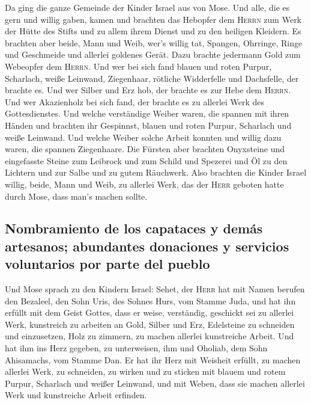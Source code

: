  Da ging die ganze Gemeinde der Kinder Israel aus von
Mose.  Und alle, die es gern und willig gaben, kamen und
brachten das Hebopfer dem \textsc{Herrn} zum Werk der Hütte des Stifts
und zu allem ihrem Dienst und zu den heiligen Kleidern. 
Es brachten aber beide, Mann und Weib, wer's willig tat, Spangen,
Ohrringe, Ringe und Geschmeide und allerlei goldenes Gerät. Dazu brachte
jedermann Gold zum Webeopfer dem \textsc{Herrn}.  Und wer
bei sich fand blauen und roten Purpur, Scharlach, weiße Leinwand,
Ziegenhaar, rötliche Widderfelle und Dachsfelle, der brachte es.
 Und wer Silber und Erz hob, der brachte es zur Hebe dem
\textsc{Herrn}. Und wer Akazienholz bei sich fand, der brachte es zu
allerlei Werk des Gottesdienstes.  Und welche verständige
Weiber waren, die spannen mit ihren Händen und brachten ihr Gespinnst,
blauen und roten Purpur, Scharlach und weiße Leinwand. 
Und welche Weiber solche Arbeit konnten und willig dazu waren, die
spannen Ziegenhaare.  Die Fürsten aber brachten
Onyxsteine und eingefasste Steine zum Leibrock und zum Schild
 und Spezerei und Öl zu den Lichtern und zur Salbe und zu
gutem Räuchwerk.  Also brachten die Kinder Israel willig,
beide, Mann und Weib, zu allerlei Werk, das der \textsc{Herr} geboten
hatte durch Mose, dass man's machen sollte.

\hypertarget{nombramiento-de-los-capataces-y-demuxe1s-artesanos-abundantes-donaciones-y-servicios-voluntarios-por-parte-del-pueblo}{%
\subsection{Nombramiento de los capataces y demás artesanos; abundantes
donaciones y servicios voluntarios por parte del
pueblo}\label{nombramiento-de-los-capataces-y-demuxe1s-artesanos-abundantes-donaciones-y-servicios-voluntarios-por-parte-del-pueblo}}

 Und Mose sprach zu den Kindern Israel: Sehet, der
\textsc{Herr} hat mit Namen berufen den Bezaleel, den Sohn Uris, des
Sohnes Hurs, vom Stamme Juda,  und hat ihn erfüllt mit
dem Geist Gottes, dass er weise, verständig, geschickt sei zu allerlei
Werk,  kunstreich zu arbeiten an Gold, Silber und Erz,
 Edelsteine zu schneiden und einzusetzen, Holz zu
zimmern, zu machen allerlei kunstreiche Arbeit.  Und hat
ihm ins Herz gegeben, zu unterweisen, ihm und Oholiab, dem Sohn
Ahisamachs, vom Stamme Dan.  Er hat ihr Herz mit Weisheit
erfüllt, zu machen allerlei Werk, zu schneiden, zu wirken und zu sticken
mit blauem und rotem Purpur, Scharlach und weißer Leinwand, und mit
Weben, dass sie machen allerlei Werk und kunstreiche Arbeit erfinden.

